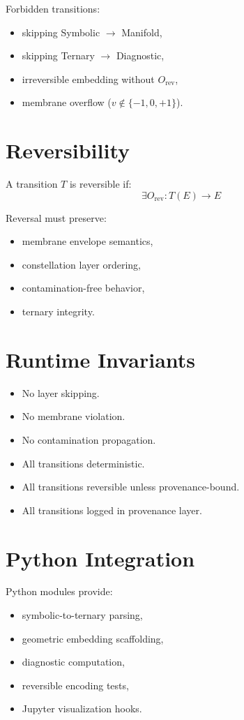 \documentclass[12pt]{article}
\begin{document}
Forbidden transitions:
\begin{itemize}
  \item skipping Symbolic $\rightarrow$ Manifold,
  \item skipping Ternary $\rightarrow$ Diagnostic,
  \item irreversible embedding without $O_{\text{rev}}$,
  \item membrane overflow ($v \notin \{-1,0,+1\}$).
\end{itemize}

\section{Reversibility}

A transition $T$ is reversible if:
\[
\exists O_{\text{rev}} : T(E) \rightarrow E
\]

Reversal must preserve:
\begin{itemize}
  \item membrane envelope semantics,
  \item constellation layer ordering,
  \item contamination-free behavior,
  \item ternary integrity.
\end{itemize}

\section{Runtime Invariants}

\begin{itemize}
  \item No layer skipping.
  \item No membrane violation.
  \item No contamination propagation.
  \item All transitions deterministic.
  \item All transitions reversible unless provenance-bound.
  \item All transitions logged in provenance layer.
\end{itemize}

\section{Python Integration}

Python modules provide:
\begin{itemize}
  \item symbolic-to-ternary parsing,
  \item geometric embedding scaffolding,
  \item diagnostic computation,
  \item reversible encoding tests,
  \item Jupyter visualization hooks.
\end{itemize}
\end{document}
